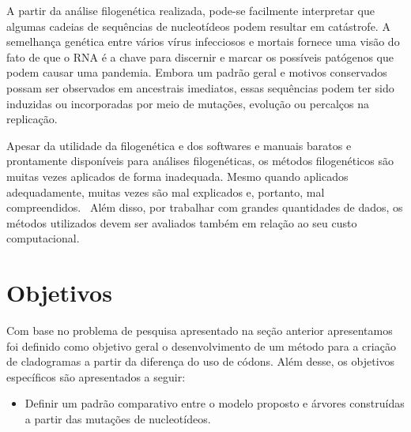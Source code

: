 \documentclass[font=plain]{abnt}
\begin{document}
A partir da análise filogenética realizada, pode-se facilmente interpretar que algumas cadeias de sequências de nucleotídeos podem resultar em catástrofe. A semelhança genética entre vários vírus infecciosos e mortais fornece uma visão do fato de que o RNA é a chave para discernir e marcar os possíveis patógenos que podem causar uma pandemia. Embora um padrão geral e motivos conservados possam ser observados em ancestrais imediatos, essas sequências podem ter sido induzidas ou incorporadas por meio de mutações, evolução ou percalços na replicação.~\cite[p. 11]{behl_threat_2022}

Apesar da utilidade da filogenética e dos softwares e manuais baratos e prontamente disponíveis para análises filogenéticas, os métodos filogenéticos são muitas vezes aplicados de forma inadequada. Mesmo quando aplicados adequadamente, muitas vezes são mal explicados e, portanto, mal compreendidos.~\cite[p. 1]{barry_phylogenetic_analysis_2006} Além disso, por trabalhar com grandes quantidades de dados, os métodos utilizados devem ser avaliados também em relação ao seu custo computacional.





\chapter{Objetivos}
Com base no problema de pesquisa apresentado na seção anterior apresentamos foi definido como objetivo geral o desenvolvimento de um método para a criação de cladogramas a partir da diferença do uso de códons. Além desse, os objetivos específicos são apresentados a seguir:
\begin{itemize}
    \item Definir um padrão comparativo entre o modelo proposto e árvores construídas a partir das mutações de nucleotídeos.
\end{itemize}
\end{document}
